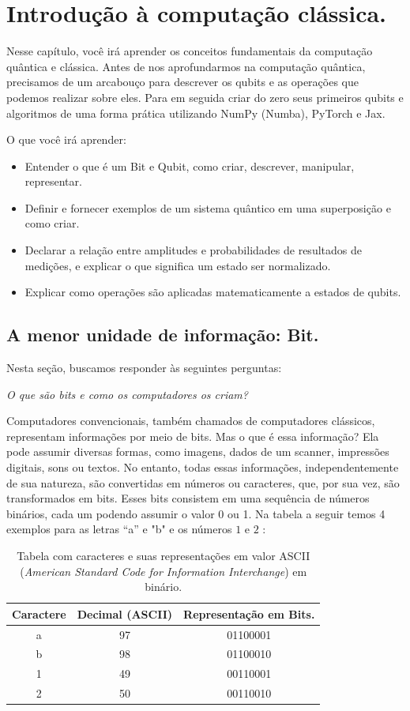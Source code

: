 \newpage
\section{Introdução à computação clássica.}
Nesse capítulo, você irá aprender os conceitos fundamentais da computação quântica e clássica. Antes de nos aprofundarmos na computação quântica, precisamos de um arcabouço para descrever os qubits e as operações que podemos realizar sobre eles. Para em seguida criar do zero seus primeiros qubits e algoritmos de uma forma prática utilizando NumPy (Numba), PyTorch e Jax. 

 O que você irá aprender:
\begin{itemize}
    \item Entender o que é um Bit e Qubit, como criar, descrever, manipular, representar.
    \item Definir e fornecer exemplos de um sistema quântico em uma superposição e como criar.
    
    \item Declarar a relação entre amplitudes e probabilidades de resultados de medições, e explicar o que significa um estado ser normalizado.
    \item Explicar como operações são aplicadas matematicamente a estados de qubits.
\end{itemize}
 
\newpage
\subsection{A menor unidade de informação: Bit.}
Nesta seção, buscamos responder às seguintes perguntas: 
\begin{center}
    \textit{O que são bits e como os computadores os criam?}
\end{center}
Computadores convencionais, também chamados de computadores clássicos, representam informações por meio de bits. Mas o que é essa informação? Ela pode assumir diversas formas, como imagens, dados de um scanner, impressões digitais, sons ou textos. No entanto, todas essas informações, independentemente de sua natureza, são convertidas em números ou caracteres, que, por sua vez, são transformados em bits. Esses bits consistem em uma sequência de números binários, cada um podendo assumir o valor 0 ou 1. Na tabela a seguir temos 4 exemplos para as letras “a” e "b" e os números $1$ e $2$ : 
\begin{table}[h!]
    \centering
    \begin{tabular}{|c|c|c|}
        \hline
        \textbf{Caractere} & \textbf{Decimal (ASCII)}  & \textbf{Representação em Bits.} \\ \hline
        a & 97 & 01100001 \\ \hline
        b & 98 & 01100010 \\ \hline
        1 & 49 & 00110001 \\ \hline
        2 & 50 & 00110010 \\ \hline
    \end{tabular}
    \caption{Tabela com caracteres e suas representações em valor ASCII (\textit{American Standard Code for Information Interchange}) em binário.}
    \label{tab:caracteres_bits}
\end{table}

